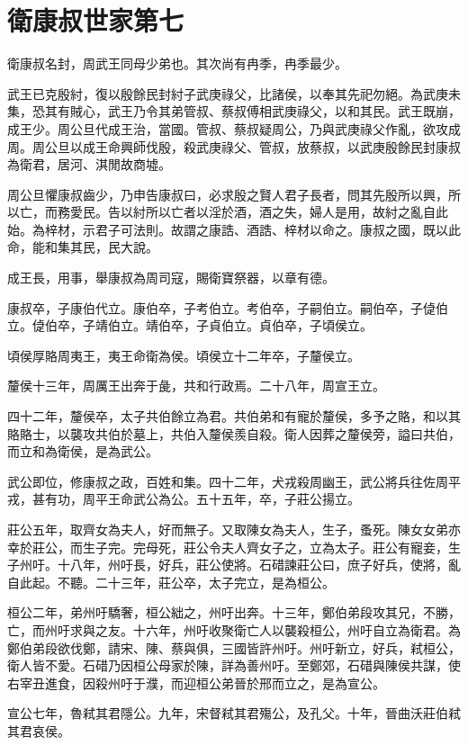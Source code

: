 \chapter{衛康叔世家第七}

衛康叔名封，周武王同母少弟也。其次尚有冉季，冉季最少。

武王已克殷紂，復以殷餘民封紂子武庚祿父，比諸侯，以奉其先祀勿絕。為武庚未集，恐其有賊心，武王乃令其弟管叔、蔡叔傅相武庚祿父，以和其民。武王既崩，成王少。周公旦代成王治，當國。管叔、蔡叔疑周公，乃與武庚祿父作亂，欲攻成周。周公旦以成王命興師伐殷，殺武庚祿父、管叔，放蔡叔，以武庚殷餘民封康叔為衛君，居河、淇閒故商墟。

周公旦懼康叔齒少，乃申告康叔曰，必求殷之賢人君子長者，問其先殷所以興，所以亡，而務愛民。告以紂所以亡者以淫於酒，酒之失，婦人是用，故紂之亂自此始。為梓材，示君子可法則。故謂之康誥、酒誥、梓材以命之。康叔之國，既以此命，能和集其民，民大說。

成王長，用事，舉康叔為周司寇，賜衛寶祭器，以章有德。

康叔卒，子康伯代立。康伯卒，子考伯立。考伯卒，子嗣伯立。嗣伯卒，子偼伯立。偼伯卒，子靖伯立。靖伯卒，子貞伯立。貞伯卒，子頃侯立。

頃侯厚賂周夷王，夷王命衛為侯。頃侯立十二年卒，子釐侯立。

釐侯十三年，周厲王出奔于彘，共和行政焉。二十八年，周宣王立。

四十二年，釐侯卒，太子共伯餘立為君。共伯弟和有寵於釐侯，多予之賂，和以其賂賂士，以襲攻共伯於墓上，共伯入釐侯羨自殺。衛人因葬之釐侯旁，謚曰共伯，而立和為衛侯，是為武公。

武公即位，修康叔之政，百姓和集。四十二年，犬戎殺周幽王，武公將兵往佐周平戎，甚有功，周平王命武公為公。五十五年，卒，子莊公揚立。

莊公五年，取齊女為夫人，好而無子。又取陳女為夫人，生子，蚤死。陳女女弟亦幸於莊公，而生子完。完母死，莊公令夫人齊女子之，立為太子。莊公有寵妾，生子州吁。十八年，州吁長，好兵，莊公使將。石碏諫莊公曰，庶子好兵，使將，亂自此起。不聽。二十三年，莊公卒，太子完立，是為桓公。

桓公二年，弟州吁驕奢，桓公絀之，州吁出奔。十三年，鄭伯弟段攻其兄，不勝，亡，而州吁求與之友。十六年，州吁收聚衛亡人以襲殺桓公，州吁自立為衛君。為鄭伯弟段欲伐鄭，請宋、陳、蔡與俱，三國皆許州吁。州吁新立，好兵，弒桓公，衛人皆不愛。石碏乃因桓公母家於陳，詳為善州吁。至鄭郊，石碏與陳侯共謀，使右宰丑進食，因殺州吁于濮，而迎桓公弟晉於邢而立之，是為宣公。

宣公七年，魯弒其君隱公。九年，宋督弒其君殤公，及孔父。十年，晉曲沃莊伯弒其君哀侯。

